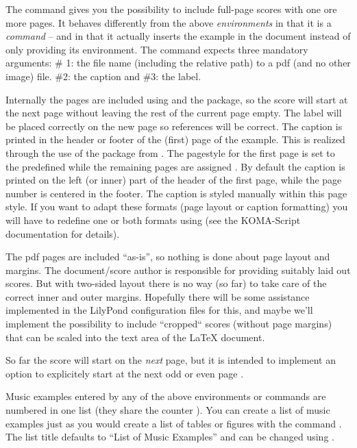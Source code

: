 \documentclass[../openLilyLib]{subfiles}
\begin{document}
The  command gives you the possibility to include full-page scores with one ore more pages.
It behaves differently from the above \emph{environments} in that it is a \emph{command} -- and in that it actually inserts the example in the document instead of only providing its environment.
The command expects three mandatory arguments: 
\# 1: the file name (including the relative path) to a pdf (and no other image) file.
\#2: the caption and \#3: the label.

Internally the pages are included using  and the  package, so the score will start at the next page without leaving the rest of the current page empty.
The label will be placed correctly on the new page so references will be correct.
The caption is printed in the header or footer of the (first) page of the example.
This is realized through the use of the  package from .
The pagestyle for the first page is set to the predefined  while the remaining pages are assigned .
By default the caption is printed on the left (or inner) part of the header of the first page, while the page number is centered in the footer.
The caption is styled manually within this page style.
If you want to adapt these formats (page layout or caption formatting) you will have to redefine one or both formats using  (see the KOMA-Script documentation for details).
\begin{knownIssues}
The pdf pages are included “as-is”, so nothing is done about page layout and margins.
The document/score author is responsible for providing suitably laid out scores.
But with two-sided layout there is no way (so far) to take care of the correct inner and outer margins.
Hopefully there will be some assistance implemented in the LilyPond configuration files for this, and maybe we'll implement the possibility to include “cropped“ scores (without page margins) that can be scaled into the text area of the \LaTeX{} document.

So far the score will start on the \emph{next} page, but it is intended to implement an option to explicitely start at the next odd or even page .
\end{knownIssues}

\bigskip
Music examples entered by any of the above environments or commands are numbered in one list (they share the counter ).
You can create a list of music examples just as you would create a list of tables or figures with the command .
The list title defaults to “List of Music Examples” and can be changed using .
\end{document}
